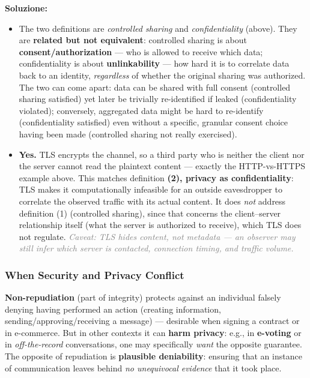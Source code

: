 \documentclass[12pt, a4paper]{article}
\begin{document}
\textbf{Soluzione:}
\begin{itemize}
    \item[(a)] The two definitions are \emph{controlled sharing} and \emph{confidentiality} (above). They are \textbf{related but not equivalent}: controlled sharing is about \textbf{consent/authorization} — who is allowed to receive which data; confidentiality is about \textbf{unlinkability} — how hard it is to correlate data back to an identity, \emph{regardless} of whether the original sharing was authorized. The two can come apart: data can be shared with full consent (controlled sharing satisfied) yet later be trivially re-identified if leaked (confidentiality violated); conversely, aggregated data might be hard to re-identify (confidentiality satisfied) even without a specific, granular consent choice having been made (controlled sharing not really exercised).
    \item[(c)] \textbf{Yes.} TLS encrypts the channel, so a third party who is neither the client nor the server cannot read the plaintext content — exactly the HTTP-vs-HTTPS example above. This matches definition \textbf{(2), privacy as confidentiality}: TLS makes it computationally infeasible for an outside eavesdropper to correlate the observed traffic with its actual content. It does \emph{not} address definition (1) (controlled sharing), since that concerns the client--server relationship itself (what the server is authorized to receive), which TLS does not regulate. \textcolor{gray}{\textit{Caveat: TLS hides content, not metadata — an observer may still infer which server is contacted, connection timing, and traffic volume.}}
\end{itemize}

\subsubsection{When Security and Privacy Conflict}
\textbf{Non-repudiation} (part of integrity) protects against an individual falsely denying having performed an action (creating information, sending/approving/receiving a message) — desirable when signing a contract or in e-commerce. But in other contexts it can \textbf{harm privacy}: e.g., in \textbf{e-voting} or in \emph{off-the-record} conversations, one may specifically \emph{want} the opposite guarantee. The opposite of repudiation is \textbf{plausible deniability}: ensuring that an instance of communication leaves behind \emph{no unequivocal evidence} that it took place.
\end{document}
